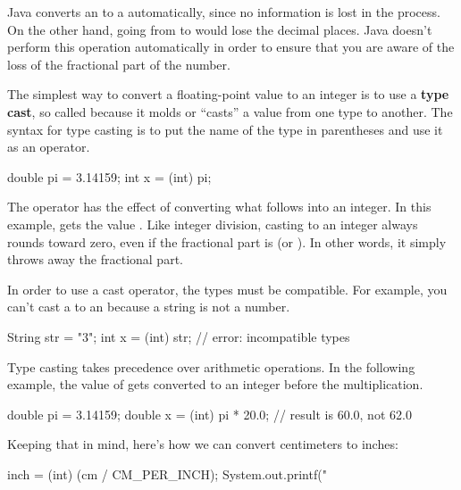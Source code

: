 {{

Java converts an  to a  automatically, since no information is lost in the process.
On the other hand, going from  to  would lose the decimal places.
Java doesn't perform this operation automatically in order to ensure that you are aware of the loss of the fractional part of the number.


The simplest way to convert a floating-point value to an integer is to use a {\bf type cast}, so called because it molds or ``casts'' a value from one type to another.
The syntax for type casting is to put the name of the type in parentheses and use it as an operator.

\begin{code}
double pi = 3.14159;
int x = (int) pi;
\end{code}

The  operator has the effect of converting what follows into an integer.
In this example,  gets the value .
Like integer division, casting to an integer always rounds toward zero, even if the fractional part is  (or ).
In other words, it simply throws away the fractional part.

In order to use a cast operator, the types must be compatible.
For example, you can't cast a  to an  because a string is not a number.

\begin{code}
String str = "3";
int x = (int) str;  // error: incompatible types
\end{code}

Type casting takes precedence over arithmetic operations.
In the following example, the value of  gets converted to an integer before the multiplication.

\begin{code}
double pi = 3.14159;
double x = (int) pi * 20.0;  // result is 60.0, not 62.0
\end{code}


Keeping that in mind, here's how we can convert centimeters to inches:

\begin{code}
inch = (int) (cm / CM_PER_INCH);
System.out.printf("%
\end{code}

}}
